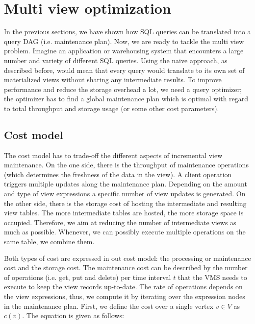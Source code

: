 \section{Multi view optimization}


In the previous sections, we have shown how SQL queries can be 
translated into a query DAG (i.e. maintenance plan). Now, we are ready 
to tackle the multi view problem. Imagine an application or warehousing
system that encounters a large number and variety of different SQL 
queries. Using the naive approach, as described before, would mean
that every query would translate to its own set of materialized views
without sharing any intermediate results. To improve performance and
reduce the storage overhead a lot, we need a query optimizer; the 
optimizer has to find a global maintenance plan which is optimal 
with regard to total throughput and storage usage (or some other cost
parameters). 




\subsection{Cost model}


The cost model has to trade-off the different aspects of incremental
view maintenance. On the one side, there is the throughput of
maintenance operations (which determines the freshness of the data in
the view). A client operation triggers multiple updates along the 
maintenance plan. Depending on the amount and type of view expressions 
a specific number of view updates is generated. On the other side, there 
is the storage cost of hosting the intermediate and resulting view tables. 
The more intermediate tables are hosted, the more storage space is 
occupied. Therefore, we aim at reducing the number of intermediate views 
as much as possible. Whenever, we can possibly execute multiple operations 
on the same table, we combine them.

Both types of cost are expressed in out cost model: the processing or 
maintenance cost and the storage cost. The maintenance cost can be 
described by the number of operations (i.e. get, put and delete) per 
time interval $t$ that the VMS needs to execute to keep the view records 
up-to-date. The rate of operations depends on the view expressions, 
thus, we compute it by iterating over the expression nodes in the 
maintenance plan. First, we define the cost over a single  
vertex $v \in V$ as $c(v)$. The equation is given as follows: 




